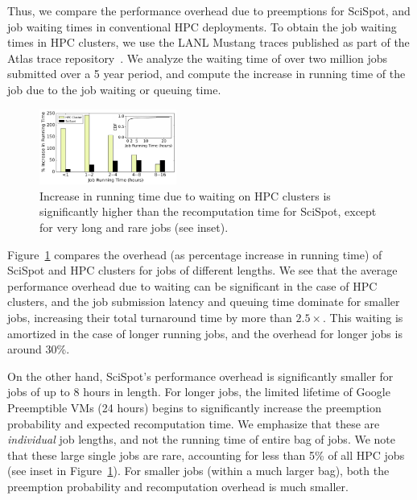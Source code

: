 \documentclass[compsoc]{IEEEtran}
\newcommand{\sysname}{SciSpot\xspace}
\newcommand{\myfigspace}[0]{-0.45cm}
\begin{document}
Thus, we compare the performance overhead due to preemptions for \sysname, and job waiting times in conventional HPC deployments.
To obtain the job waiting times in HPC clusters, we use the LANL Mustang traces published as part of the Atlas trace repository~\cite{cmu-atlas}. 
We analyze the waiting time of over two million jobs submitted over a 5 year period, and compute the increase in running time of the job due to the job waiting or queuing time. 

\begin{figure}[t]
  \centering 
  \includegraphics[width=0.4\textwidth]{hpc-vs-scispot.pdf}
      \vspace*{\myfigspace}
  \caption{Increase in running time due to waiting on HPC clusters is significantly higher than the recomputation time for \sysname, except for very long and rare jobs (see inset). }
  \label{fig:hpc-vs-scispot}
  \vspace*{\myfigspace}
\end{figure}


Figure~\ref{fig:hpc-vs-scispot} compares the overhead (as percentage increase in running time) of \sysname and HPC clusters  for jobs of different lengths. We see that the average performance overhead due to waiting can be significant in the case of HPC clusters, and the job submission latency and queuing time dominate for smaller jobs, increasing their total turnaround time by more than $2.5\times$.
This waiting is amortized in the case of longer running jobs, and the overhead for longer jobs is around 30\%.

On the other hand, \sysname's performance overhead is significantly smaller for jobs of up to 8 hours in length.
For longer jobs, the limited lifetime of Google Preemptible VMs (24 hours) begins to significantly increase the preemption probability and expected recomputation time.
We emphasize that these are \emph{individual} job lengths, and not the running time of entire bag of jobs.
We note that these large single jobs are rare, accounting for less than 5\% of all HPC jobs (see inset in Figure~\ref{fig:hpc-vs-scispot}).
For smaller jobs (within a much larger bag), both the preemption probability and recomputation overhead is much smaller.
\end{document}

